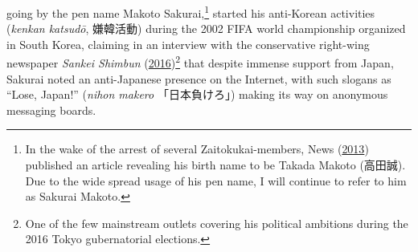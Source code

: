 \documentclass[10pt,british,A4paper,,openany]{memoir}
\begin{document}
going by the pen name Makoto Sakurai,\footnote{In the wake of the arrest
  of several Zaitokukai-members, News
  (\protect\hyperlink{ref-nikkei_news__2013}{2013}) published an article
  revealing his birth name to be Takada Makoto (高田誠). Due to the wide
  spread usage of his pen name, I will continue to refer to him as
  Sakurai Makoto.} started his anti-Korean activities (\emph{kenkan
katsudō}, 嫌韓活動) during the 2002 FIFA world championship organized in
South Korea, claiming in an interview with the conservative right-wing
newspaper \emph{Sankei Shimbun}
(\protect\hyperlink{ref-sankei_news__2016}{2016})\footnote{One of the
  few mainstream outlets covering his political ambitions during the
  2016 Tokyo gubernatorial elections.} that despite immense support from
Japan, Sakurai noted an anti-Japanese presence on the Internet, with
such slogans as ``Lose, Japan!'' (\emph{nihon makero} 「日本負けろ」)
making its way on anonymous messaging boards.
\end{document}
